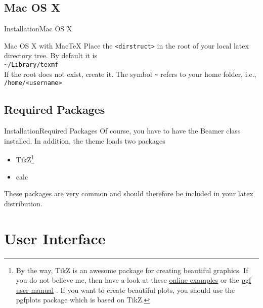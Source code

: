 \documentclass[10pt]{beamer}
\newcommand{\chref}[2]{%
  \href{#1}{{\usebeamercolor[bg]{AAUsimple}#2}}%
}
\begin{document}
\subsection{Mac OS X}
\begin{frame}{Installation}{Mac OS X}
  \begin{block}{Mac OS X with MacTeX}
     Place the {\tt <dirstruct>} in the root of your local latex directory tree. By default it is\\
        {\tt \textasciitilde /Library/texmf}\\
        If the root does not exist, create it. The symbol {\tt \textasciitilde} refers to your home folder, i.e., {\tt /home/<username>}
  \end{block}
\end{frame}

\subsection{Required Packages}
\begin{frame}{Installation}{Required Packages}
  Of course, you have to have the Beamer class installed. In addition, the theme loads two packages
  \begin{itemize}
    \item TikZ\footnote{By the way, TikZ is an awesome package for creating beautiful graphics. If you do not believe me, then have a look at these \chref{http://www.texample.net/tikz/examples/}{online examples} or the \chref{http://tug.ctan.org/tex-archive/graphics/pgf/base/doc/generic/pgf/pgfmanual.pdf}{pgf user manual}. If you want to create beautiful plots, you should use the pgfplots package which is based on TikZ.}
    \item calc
  \end{itemize}
  These packages are very common and should therefore be included in your latex distribution.
\end{frame}

\section{User Interface}
\end{document}
